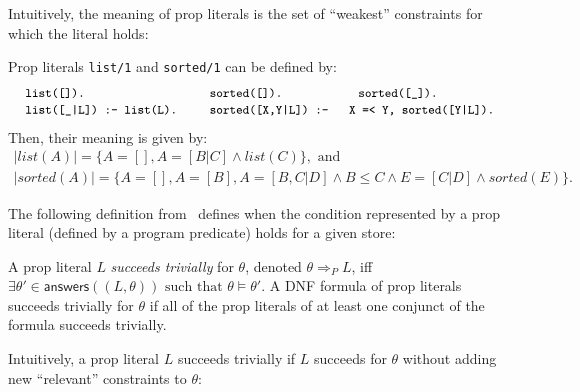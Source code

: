\documentclass{llncs}
\newcommand{\skbd}[1]{\mbox{\tt\small{#1}}}
\newcommand{\answers}[1]{\ensuremath{\textsf{answers}(#1)}}
\begin{document}
Intuitively, the meaning of prop literals is the set of ``weakest''
constraints for which the literal holds:

\begin{example}
  \label{ex:props}
  Prop literals \skbd{list/1} and \skbd{sorted/1} can be defined by:
    \[
    \begin{array}{lll}
      \skbd{list([]).}~~ 
    & ~~\skbd{sorted([]).}~~ 
    & ~~\skbd{sorted([\_]).}
    \\
      \skbd{list([\_|L]) :- list(L).}~~
    & ~~\skbd{sorted([X,Y|L]) :- }
    & \skbd{X =< Y, sorted([Y|L]).}
    \end{array}
    \]
  Then, their meaning is given by:
  \[
  \begin{array}{c}
    |list(A)| = \{A=[], A=[B|C] \wedge list(C)\}, \textrm{ and}
  \\
    |sorted(A)| = \{A=[], A=[B], A=[B,C|D] \wedge B\leq C
    \wedge E = [C|D] \wedge sorted(E)\}.
  \end{array}
  \]
\end{example}

The following definition from~\cite{assrt-theoret-framework-lopstr99}
defines when the condition represented by a prop literal (defined by a
program predicate) holds for a given store:

\begin{definition}
  \label{def:succeeds-triv}
  A prop literal $L$ \emph{succeeds trivially} for $\theta$, denoted
  $\theta \Rightarrow_P L$, iff $\exists \theta'\in
  \answers{(L,\theta)} \mbox{ such that } \theta\models\theta'$.
A DNF formula of prop literals succeeds trivially for $\theta$ if
  all of the prop literals of at least one conjunct of the formula
  succeeds trivially.
\end{definition}

Intuitively, a prop literal $L$ succeeds trivially if $L$ succeeds for
$\theta$ without adding new ``relevant'' constraints to $\theta$:
\end{document}
